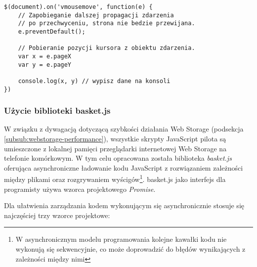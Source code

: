 \lstset{language=JavaScript}
\begin{lstlisting}
$(document).on('vmousemove', function(e) {
	// Zapobieganie dalszej propagacji zdarzenia
	// po przechwyceniu, strona nie bedzie przewijana.
	e.preventDefault();
	
	// Pobieranie pozycji kursora z obiektu zdarzenia.
	var x = e.pageX
	var y = e.pageY
	
	console.log(x, y) // wypisz dane na konsoli
})
\end{lstlisting}

\subsubsection{Użycie biblioteki basket.js}
\label{subsub:tools-basketjs}

W związku z dywagacją dotyczącą szybkości działania Web Storage (podsekcja \ref{subsub:webstorage-performance}), wszystkie skrypty JavaScript pilota są umieszczone z lokalnej pamięci przeglądarki internetowej Web Storage na telefonie komórkowym. W tym celu opracowana została biblioteka \emph{basket.js} oferująca asynchroniczne ładowanie kodu JavaScript z rozwiązaniem zależności między plikami oraz rozgrywaniem wyścigów\footnote{W asynchronicznym modelu programowania kolejne kawałki kodu nie wykonują się sekwencyjnie, co może doprowadzić do błędów wynikających z zależności między nimi}. basket.js jako interfejs dla programisty używa wzorca projektowego \emph{Promise}.

Dla ułatwienia zarządzania kodem wykonującym się asynchronicznie stosuje się najczęściej trzy wzorce projektowe:

